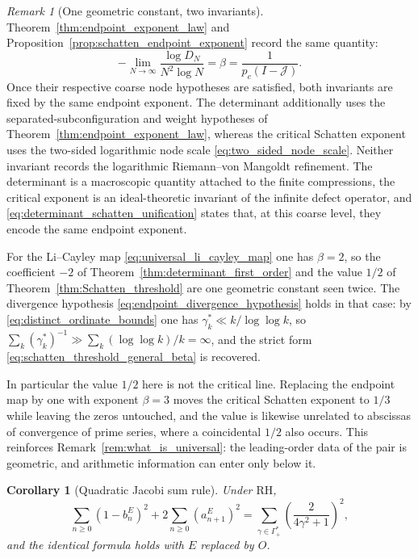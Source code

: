 \documentclass[preprint,12pt]{elsarticle}
\numberwithin{equation}{section}
\theoremstyle{plain}
\newtheorem{corollary}[theorem]{Corollary}
\theoremstyle{definition}
\theoremstyle{remark}
\newtheorem{remark}[theorem]{Remark}
\newcommand{\RH}{\mathrm{RH}}
\begin{document}
\begin{remark}[One geometric constant, two invariants]
\label{rem:beta_two_invariants}
Theorem~\ref{thm:endpoint_exponent_law} and Proposition~\ref{prop:schatten_endpoint_exponent} record the same quantity:
\begin{equation}
-\lim_{N\to\infty}\frac{\log D_N}{N^2\log N}
=\beta
=\frac{1}{p_c(I-\mathcal J)}.
\label{eq:determinant_schatten_unification}
\end{equation}
Once their respective coarse node hypotheses are satisfied, both invariants are fixed by the same endpoint exponent.  The determinant additionally uses the separated-subconfiguration and weight hypotheses of Theorem~\ref{thm:endpoint_exponent_law}, whereas the critical Schatten exponent uses the two-sided logarithmic node scale \eqref{eq:two_sided_node_scale}.  Neither invariant records the logarithmic Riemann--von Mangoldt refinement.  The determinant is a macroscopic quantity attached to the finite compressions, the critical exponent is an ideal-theoretic invariant of the infinite defect operator, and \eqref{eq:determinant_schatten_unification} states that, at this coarse level, they encode the same endpoint exponent.

For the Li--Cayley map \eqref{eq:universal_li_cayley_map} one has $\beta=2$, so the coefficient $-2$ of Theorem~\ref{thm:determinant_first_order} and the value $1/2$ of Theorem~\ref{thm:Schatten_threshold} are one geometric constant seen twice. The divergence hypothesis \eqref{eq:endpoint_divergence_hypothesis} holds in that case: by \eqref{eq:distinct_ordinate_bounds} one has $\gamma_k^*\ll k/\log\log k$, so $\sum_k(\gamma_k^*)^{-1}\gg\sum_k(\log\log k)/k=\infty$, and the strict form \eqref{eq:schatten_threshold_general_beta} is recovered.

In particular the value $1/2$ here is not the critical line. Replacing the endpoint map by one with exponent $\beta=3$ moves the critical Schatten exponent to $1/3$ while leaving the zeros untouched, and the value is likewise unrelated to abscissas of convergence of prime series, where a coincidental $1/2$ also occurs. This reinforces Remark~\ref{rem:what_is_universal}: the leading-order data of the pair is geometric, and arithmetic information can enter only below it.
\end{remark}

\begin{corollary}[Quadratic Jacobi sum rule]
\label{cor:quadratic_jacobi_sum_rule}
Under $\RH$,
\begin{equation}
\sum_{n\ge0}(1-b_n^E)^2+2\sum_{n\ge0}(a_{n+1}^E)^2
=
\sum_{\gamma\in\Gamma_+^*}\left(\frac{2}{4\gamma^2+1}\right)^2,
\label{eq:E_quadratic_sum_rule}
\end{equation}
and the identical formula holds with $E$ replaced by $O$.
\end{corollary}
\end{document}
